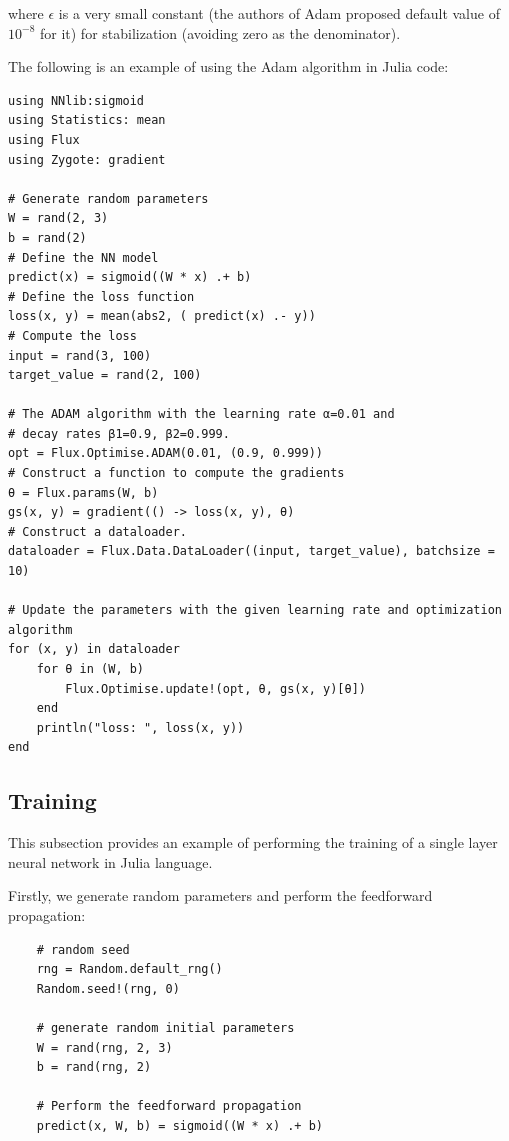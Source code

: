 \documentclass[
	parskip, 			   %
	twoside, 			   %
	DIV=14, 			   %
	BCOR=15.0mm, 		   %
	headsepline, 		   %
	open=right, 		   %
	captions=tableheading, %
	bibliography=totoc,    %
	numbers=noenddot       %
]{scrreprt}
\begin{document}
where $\epsilon$ is a very small constant (the authors of Adam proposed default value of $10^{-8}$ for it) for stabilization (avoiding zero as the denominator). 

The following is an example of using the Adam algorithm in Julia code:

\begin{verbatim}
using NNlib:sigmoid
using Statistics: mean
using Flux
using Zygote: gradient

# Generate random parameters
W = rand(2, 3)
b = rand(2)
# Define the NN model
predict(x) = sigmoid((W * x) .+ b)
# Define the loss function
loss(x, y) = mean(abs2, ( predict(x) .- y))
# Compute the loss
input = rand(3, 100)
target_value = rand(2, 100)

# The ADAM algorithm with the learning rate α=0.01 and 
# decay rates β1=0.9, β2=0.999.
opt = Flux.Optimise.ADAM(0.01, (0.9, 0.999))
# Construct a function to compute the gradients
θ = Flux.params(W, b)
gs(x, y) = gradient(() -> loss(x, y), θ)
# Construct a dataloader.
dataloader = Flux.Data.DataLoader((input, target_value), batchsize = 10)

# Update the parameters with the given learning rate and optimization algorithm
for (x, y) in dataloader
    for θ in (W, b) 
        Flux.Optimise.update!(opt, θ, gs(x, y)[θ])
    end
    println("loss: ", loss(x, y))
end
\end{verbatim}


\subsection{Training}
This subsection provides an example of performing the training of a single layer neural network in Julia language.

Firstly, we generate random parameters and perform the feedforward propagation:

\begin{verbatim}
    # random seed
    rng = Random.default_rng()
    Random.seed!(rng, 0)
    
    # generate random initial parameters
    W = rand(rng, 2, 3)
    b = rand(rng, 2)

    # Perform the feedforward propagation
    predict(x, W, b) = sigmoid((W * x) .+ b)
\end{verbatim}
\end{document}
